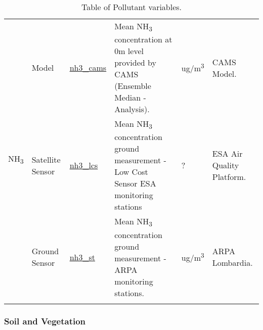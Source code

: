 \begin{center}
\begin{longtable}{ |p{2cm}|p{1.5cm}|p{2.3cm}|p{4cm}|p{1cm}|p{2cm}| }
\multirow{3}{4em}{NH\textsubscript{3}} & Model  & \underline{nh3\_cams} & Mean NH\textsubscript{3} concentration at 0m level provided by CAMS  (Ensemble Median - Analysis). & ug/m\textsuperscript{3} & CAMS Model.\\ 
& Satellite \newline Sensor  & \underline{nh3\_lcs} &  Mean NH\textsubscript{3} concentration ground measurement - Low Cost Sensor ESA monitoring stations  & ? & ESA Air Quality Platform.\\ 
& Ground \newline Sensor & \underline{nh3\_st} &  Mean NH\textsubscript{3} concentration ground measurement - ARPA monitoring stations.  & ug/m\textsuperscript{3} & ARPA \newline Lombardia.\\ \hline
\caption{Table of Pollutant variables.}
\end{longtable}
\end{center}

\subsubsection{Soil and Vegetation}

